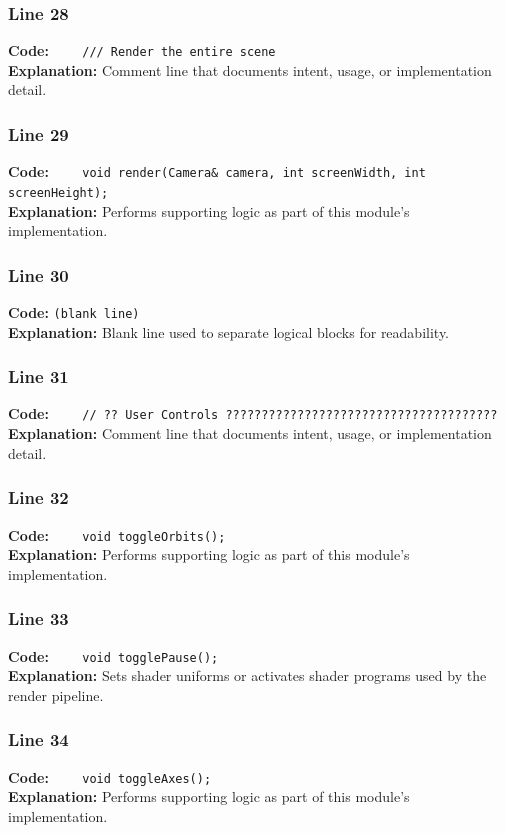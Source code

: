 \documentclass[11pt,a4paper]{article}
\begin{document}
\subsubsection*{Line 28}
\textbf{Code:} \verb|    /// Render the entire scene|\\
\textbf{Explanation:} Comment line that documents intent, usage, or implementation detail.

\subsubsection*{Line 29}
\textbf{Code:} \verb|    void render(Camera& camera, int screenWidth, int screenHeight);|\\
\textbf{Explanation:} Performs supporting logic as part of this module's implementation.

\subsubsection*{Line 30}
\textbf{Code:} \texttt{(blank line)}\\
\textbf{Explanation:} Blank line used to separate logical blocks for readability.

\subsubsection*{Line 31}
\textbf{Code:} \verb|    // ?? User Controls ??????????????????????????????????????|\\
\textbf{Explanation:} Comment line that documents intent, usage, or implementation detail.

\subsubsection*{Line 32}
\textbf{Code:} \verb|    void toggleOrbits();|\\
\textbf{Explanation:} Performs supporting logic as part of this module's implementation.

\subsubsection*{Line 33}
\textbf{Code:} \verb|    void togglePause();|\\
\textbf{Explanation:} Sets shader uniforms or activates shader programs used by the render pipeline.

\subsubsection*{Line 34}
\textbf{Code:} \verb|    void toggleAxes();|\\
\textbf{Explanation:} Performs supporting logic as part of this module's implementation.
\end{document}
